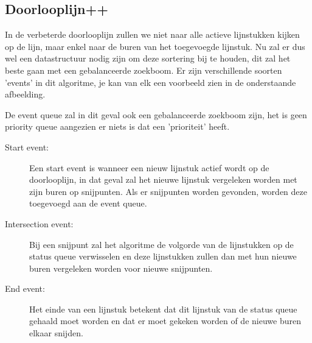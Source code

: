 \documentclass[12pt,a4paper]{article}
\begin{document}
	\subsection{Doorlooplijn++}
	In de verbeterde doorlooplijn zullen we niet naar alle actieve lijnstukken kijken op de lijn, maar enkel naar de buren van het toegevoegde lijnstuk. Nu zal er dus wel een datastructuur nodig zijn om deze sortering bij te houden, dit zal het beste gaan met een gebalanceerde zoekboom. Er zijn verschillende soorten 'events' in dit algoritme, je kan van elk een voorbeeld zien in de onderstaande afbeelding.  
	
	\begin{figure}[h]
		\centering
		\label{fig:sweepline-example}
	\end{figure}

	De event queue zal in dit geval ook een gebalanceerde zoekboom zijn, het is geen priority queue aangezien er niets is dat een 'prioriteit' heeft.
	\begin{description}
		\item[Start event:] Een start event is wanneer een nieuw lijnstuk actief wordt op de doorlooplijn, in dat geval zal het nieuwe lijnstuk vergeleken worden met zijn buren op snijpunten. Als er snijpunten worden gevonden, worden deze toegevoegd aan de event queue. 
		\item[Intersection event:] Bij een snijpunt zal het algoritme de volgorde van de lijnstukken op de status queue verwisselen en deze lijnstukken zullen dan met hun nieuwe buren vergeleken worden voor nieuwe snijpunten. 
		\item[End event:] Het einde van een lijnstuk betekent dat dit lijnstuk van de status queue gehaald moet worden en dat er moet gekeken worden of de nieuwe buren elkaar snijden. 
	\end{description}
\end{document}
